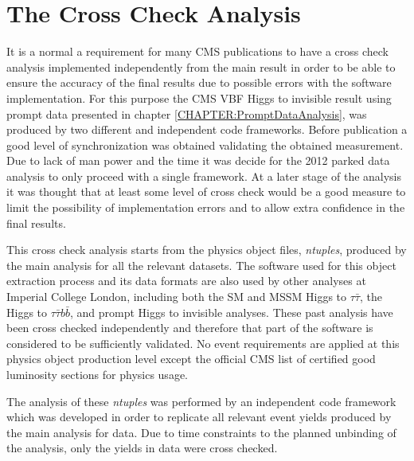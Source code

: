 \section{The Cross Check Analysis}
\label{CHAPTER:ParkedDataAnalysis_CrossCheckAnalysis}


It is a normal a requirement for many \gls{CMS} publications to have a cross check analysis implemented independently from the main result in order to be able to ensure the accuracy of the final results due to possible errors with the software implementation. For this purpose the \gls{CMS} \gls{VBF} Higgs to invisible result using prompt data presented in chapter \ref{CHAPTER:PromptDataAnalysis}, was produced by two different and independent code frameworks. Before publication a good level of synchronization was obtained validating the obtained measurement. Due to lack of man power and the time it was decide for the 2012 parked data analysis to only proceed with a single framework. At a later stage of the analysis it was thought that at least some level of cross check would be a good measure to limit the possibility of implementation errors and to allow extra confidence in the final results.
 
This cross check analysis starts from the physics object files, \textit{ntuples}, produced by the main analysis for all the relevant datasets. The software used for this object extraction process and its data formats are also used by other analyses at Imperial College London, including both the \gls{SM} and \gls{MSSM} Higgs to $\tau\bar{\tau}$, the Higgs to $\tau\bar{\tau}b\bar{b}$, and prompt Higgs to invisible analyses. These past analysis have been cross checked independently and therefore that part of the software is considered to be sufficiently validated. No event requirements are applied at this physics object production level except the official \gls{CMS} list of certified good luminosity sections for physics usage.
 
The analysis of these \textit{ntuples} was performed by an independent code framework which was developed in order to replicate all relevant event yields produced by the main analysis for data. Due to time constraints to the planned unbinding of the analysis, only the yields in data were cross checked.  

